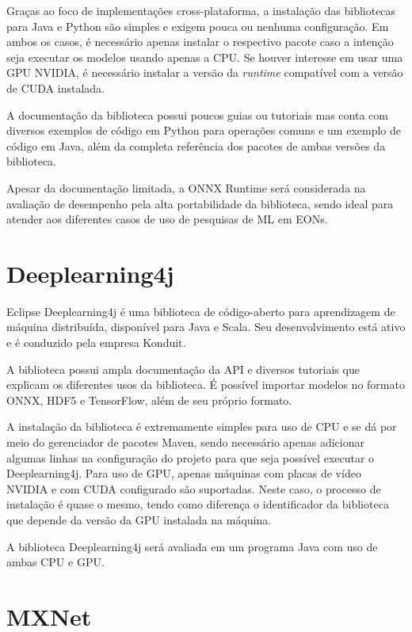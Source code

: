Graças ao foco de implementações cross-plataforma, a instalação das bibliotecas para Java e Python são simples e exigem pouca ou nenhuma configuração. Em ambos os casos, é necessário apenas instalar o respectivo pacote caso a intenção seja executar os modelos usando apenas a CPU. Se houver interesse em usar uma GPU NVIDIA, é necessário instalar a versão da \textit{runtime} compatível com a versão de \acrshort{CUDA} instalada.

A documentação da biblioteca possui poucos guias ou tutoriais mas conta com diversos exemplos de código em Python para operações comuns e um exemplo de código em Java, além da completa referência dos pacotes de ambas versões da biblioteca.

Apesar da documentação limitada, a ONNX Runtime será considerada na avaliação de desempenho pela alta portabilidade da biblioteca, sendo ideal para atender aos diferentes casos de uso de pesquisas de ML em EONs.

\section{Deeplearning4j}

Eclipse Deeplearning4j \cite{ml_site_deeplearning4j} é uma biblioteca de código-aberto para aprendizagem de máquina distribuída, disponível para Java e Scala. Seu desenvolvimento está ativo e é conduzido pela empresa Konduit.

A biblioteca possui ampla documentação da \acrshort{API} e diversos tutoriais que explicam os diferentes usos da biblioteca. É possível importar modelos no formato ONNX, HDF5 e TensorFlow, além de seu próprio formato.

A instalação da biblioteca é extremamente simples para uso de CPU e se dá por meio do gerenciador de pacotes Maven, sendo necessário apenas adicionar algumas linhas na configuração do projeto para que seja possível executar o Deeplearning4j. Para uso de GPU, apenas máquinas com placas de vídeo NVIDIA e com \acrshort{CUDA} configurado são suportadas. Neste caso, o processo de instalação é quase o mesmo, tendo como diferença o identificador da biblioteca que depende da versão da GPU instalada na máquina.

A biblioteca Deeplearning4j será avaliada em um programa Java com uso de ambas CPU e GPU.

\section{MXNet}

